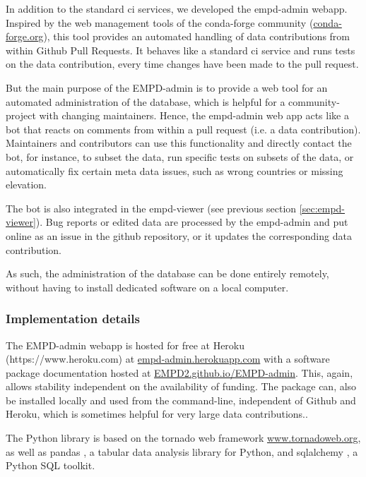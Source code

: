 \begin{refsection}
In addition to the standard \gls{ci} services, we developed the \gls{empd}-admin webapp. Inspired by the web management tools of the conda-forge community (\href{https://conda-forge.org}{conda-forge.org}), this tool provides an automated handling of data contributions from within Github Pull Requests. It behaves like a standard \gls{ci} service and runs tests on the data contribution, every time changes have been made to the pull request. 

But the main purpose of the EMPD-admin is to provide a web tool for an automated administration of the database, which is helpful for a community-project with changing maintainers. Hence, the \gls{empd}-admin web app acts like a bot that reacts on comments from within a pull request (i.e. a data contribution). Maintainers and contributors can use this functionality and directly contact the bot, for instance, to subset the data, run specific tests on subsets of the data, or automatically fix certain meta data issues, such as wrong countries or missing elevation. 

The bot is also integrated in the \gls{empd}-viewer (see previous section \ref{sec:empd-viewer}). Bug reports or edited data are processed by the \gls{empd}-admin and put online as an issue in the github repository, or it updates the corresponding data contribution.

As such, the administration of the database can be done entirely remotely, without having to install dedicated software on a local computer.

\subsubsection{Implementation details}
The EMPD-admin webapp is hosted for free at Heroku (https://www.heroku.com) at \href{https://empd-admin.herokuapp.com/}{empd-admin.herokuapp.com} with a software package documentation hosted at \href{https://EMPD2.github.io/EMPD-admin}{{EMPD2.github.io/EMPD-admin}}. This, again, allows stability independent on the availability of funding. The package can, also be installed locally and used from the command-line, independent of Github and Heroku, which is sometimes helpful for very large data contributions..

The Python library is based on the tornado web framework \href{https://www.tornadoweb.org/en/stable/}{www.tornadoweb.org}, as well as pandas \citep{McKinney2010}, a tabular data analysis library for Python, and sqlalchemy \citep{Bayer2012}, a Python SQL toolkit.


\end{refsection}
